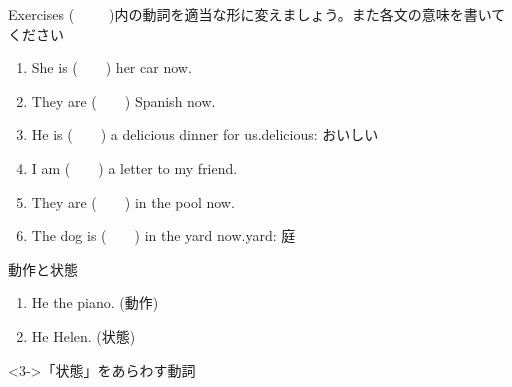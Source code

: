 \documentclass[aspectratio=169,xcolor={dvipsnames,table}]{beamer}
\newcommand{\myaudio}[1]{\href{#1}{\faVolumeUp}}
\begin{document}
\begin{frame}[plain]{Exercises}
(~~~~~)内の動詞を適当な形に変えましょう。また各文の意味を書いてください
\begin{enumerate}
 \item She is (~~~~) her car now.
 \item They are (~~~~) Spanish now. 
 \item He is  (~~~~) a delicious dinner for us.\hfill{\small delicious: おいしい}
 \item I am (~~~~) a letter to my friend.
 \item They are (~~~~) in the pool now.
 \item The dog is (~~~~) in the yard now.\hfill{\small yard: 庭}
\end{enumerate} 


\pause

\mbox{}\hfill\myaudio{./audio/021_is_ing_intro_04.mp3}
\end{frame}
\begin{frame}[plain]{動作と状態}
 \begin{enumerate}
  \item<1-> He  the piano. (動作)
  \item<2-> He  Helen. (状態)
 \end{enumerate}

\begin{block}<3->{「状態」をあらわす動詞}
\begin{itemize}

\end{itemize}


\end{block}
\end{frame}
\end{document}
